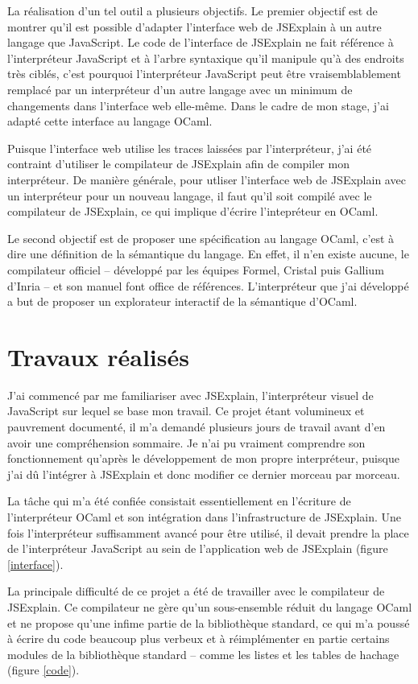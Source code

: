 \documentclass[a4paper,10pt]{article}
\begin{document}
La réalisation d'un tel outil a plusieurs objectifs. Le premier objectif est de 
montrer qu'il est possible d'adapter l'interface web de JSExplain à un autre 
langage que JavaScript. Le code de l'interface de JSExplain ne fait référence à 
l'interpréteur JavaScript et à l'arbre syntaxique qu'il manipule qu'à des 
endroits très ciblés, c'est pourquoi l'interpréteur JavaScript peut être 
vraisemblablement remplacé par un interpréteur d'un autre langage avec un 
minimum de changements dans l'interface web elle-même. Dans le cadre de mon 
stage, j'ai adapté cette interface au langage OCaml.

Puisque l'interface web utilise les traces laissées par l'interpréteur, j'ai 
été contraint d'utiliser le compilateur de JSExplain afin de compiler mon 
interpréteur. De manière générale, pour utliser l'interface web de JSExplain 
avec un interpréteur pour un nouveau langage, il faut qu'il soit compilé avec 
le compilateur de JSExplain, ce qui implique d'écrire l'intepréteur en OCaml.

Le second objectif est de proposer une spécification au langage OCaml, c'est à 
dire une définition de la sémantique du langage. En effet, il n'en existe 
aucune, le compilateur officiel -- développé par les équipes Formel, Cristal 
puis Gallium d'Inria -- et son manuel font office de références. L'interpréteur 
que j'ai développé a but de proposer un explorateur interactif de la sémantique 
d'OCaml.

\section{Travaux réalisés}
J'ai commencé par me familiariser avec JSExplain, l'interpréteur visuel de 
JavaScript sur lequel se base mon travail. Ce projet étant volumineux et 
pauvrement documenté, il m'a demandé plusieurs jours de travail avant d'en 
avoir une compréhension sommaire. Je n'ai pu vraiment comprendre son 
fonctionnement qu'après le développement de mon propre interpréteur, puisque 
j'ai dû l'intégrer à JSExplain et donc modifier ce dernier morceau par morceau.

La tâche qui m'a été confiée consistait essentiellement en l'écriture de 
l'interpréteur OCaml et son intégration dans l'infrastructure de JSExplain. Une 
fois l'interpréteur suffisamment avancé pour être utilisé, il devait prendre la 
place de l'interpréteur JavaScript au sein de l'application web de JSExplain 
(figure \ref{interface}).

La principale difficulté de ce projet a été de travailler avec le compilateur 
de JSExplain. Ce compilateur ne gère qu'un sous-ensemble réduit du langage 
OCaml et ne propose qu'une infime partie de la bibliothèque standard, ce qui 
m'a poussé à écrire du code beaucoup plus verbeux et à réimplémenter en partie 
certains modules de la bibliothèque standard -- comme les listes et les tables 
de hachage (figure \ref{code}).
\end{document}
